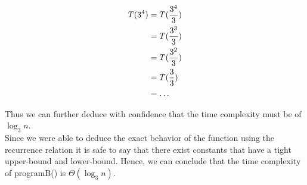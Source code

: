 \begin{align*}
    T(3^4) &= T( {3^4 \over 3} ) \\
    &= T( {3^3 \over 3} ) \\
    &= T( {3^2 \over 3} ) \\
    &= T( {3 \over 3} ) \\
    &= \ldots  \\
    \end{align*}

Thus we can further deduce with confidence that the time complexity must be of $\log_3n$.\\ 
Since we were able to deduce the exact behavior of the function using the recurrence relation it is safe to say that there exist constants that have a tight upper-bound and lower-bound. Hence, we can conclude that the time complexity of programB() is $\Theta(\log_3n)$.
    
    


